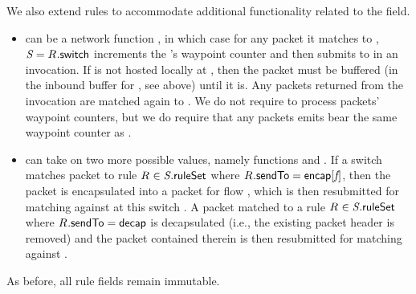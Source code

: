 We also extend rules to accommodate additional functionality
related to the  field.
\begin{itemize}[nosep,leftmargin=1em,labelwidth=*,align=left]
\item {} can be a network function \nfID{\nfIdx},
  in which case for any packet \pktID{} it matches to ,
  $\switchID{} = \ruleID{}{\switchField}$ increments the \pktID{}'s
  waypoint counter and then submits \pktID{} to \nfID{\nfIdx} in an
  \nfID{\nfIdx}{}{\processPkt{\pktID{}}} invocation.  If
  \nfID{\nfIdx}{} is not hosted locally at ,
  then the packet must be buffered (in the inbound buffer for
  \nfID{\nfIdx}, see above) until it is.  Any packets returned from
  the \nfID{\nfIdx}{}{\processPkt{\pktID{}}} invocation are matched
  again to .  We do not require \nfID{\nfIdx} to
  process packets' waypoint counters, but we do require that any
  packets \nfID{\nfIdx}{}{\processPkt{\pktID{}}} emits bear
  the same waypoint counter as \pktID{}.
\item {} can take on two more possible values,
  namely functions \encapsulate{\flowID{}} and \decapsulate.  If a
  switch \switchID{} matches packet \pktID{} to rule $\ruleID{} \in
  \switchID{}{\ruleSet}$ where $\ruleID{}{\sendToField} =
  \encapsulate{\flowID{}}$, then the packet is encapsulated into a
  packet for flow \flowID{}, which is then resubmitted for matching
  against  at this switch \switchID{}.  A packet
  matched to a rule $\ruleID{} \in \switchID{}{\ruleSet}$ where
  $\ruleID{}{\sendToField} = \decapsulate$ is decapsulated (i.e., the
  existing packet header is removed) and the packet contained therein
  is then resubmitted for matching against .
\end{itemize}
As before, all rule fields remain immutable.

